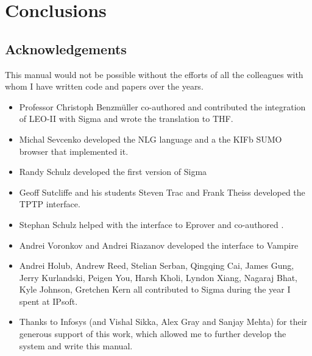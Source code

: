 \documentclass{book}
\begin{document}

\chapter{Conclusions}

\section{Acknowledgements}

This manual would not be possible without the efforts of all the colleagues with
whom I have written code and papers over the years. 

\begin{itemize}

\item Professor Christoph Benzmüller co-authored \cite{pb10} and contributed
the integration of LEO-II with Sigma and wrote the translation to THF.

\item Michal Sevcenko developed the NLG language and a the KIFb SUMO browser that 
implemented it.

\item Randy Schulz developed the first version of Sigma

\item Geoff Sutcliffe and his students Steven Trac and Frank Theiss developed the TPTP
interface.

\item Stephan Schulz helped with the interface to Eprover and co-authored \cite{ps14}.

\item Andrei Voronkov and Andrei Riazanov developed the interface to Vampire

\item Andrei Holub, Andrew Reed, Stelian Serban, Qingqing Cai, James Gung, Jerry
Kurlandski, Peigen You, Harsh Kholi, Lyndon Xiang, Nagaraj Bhat, Kyle Johnson,
Gretchen Kern all contributed to Sigma during the year I spent at IPsoft.

\item Thanks to Infosys (and Vishal Sikka, Alex Gray and Sanjay Mehta) for their
generous support of this work, which allowed me to further develop the system
and write this manual.

\end{itemize}






\newpage
\label{classindex}
\printindex[classes] %
\printindex
\end{document}
